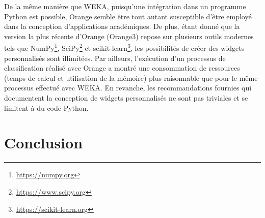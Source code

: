 De la même manière que WEKA, puisqu'une intégration dans un programme Python est possible, Orange semble être tout autant susceptible d'être employé dans la conception d'applications académiques. De plus, étant donné que la version la plus récente d'Orange (Orange3) repose sur plusieurs outils modernes tels que NumPy\footnote{\url{https://numpy.org}}, SciPy\footnote{\url{https://www.scipy.org}} et scikit-learn\footnote{\url{https://scikit-learn.org}}, les possibilités de créer des widgets personnalisés sont illimitées. Par ailleurs, l'exécution d'un processus de classification réalisé avec Orange a montré une consommation de ressources (temps de calcul et utilisation de la mémoire) plus raisonnable que pour le même processus effectué avec \acs{WEKA}. En revanche, les recommandations fournies qui documentent la conception de widgets personnalisés ne sont pas triviales et se limitent à du code Python.

\section{Conclusion}

